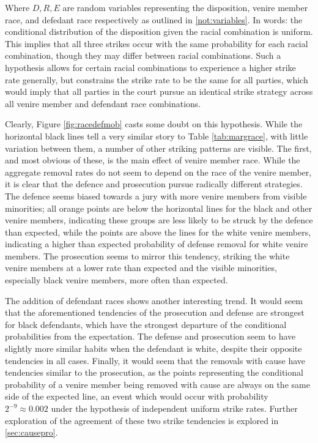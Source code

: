 Where $D, R, E$ are random variables representing the disposition, venire member race, and defedant race respectively as outlined
in \ref{not:variables}. In words: the conditional distribution of the disposition given the racial combination is uniform. This
implies that all three strikes occur with the same probability for each racial combination, though they may differ between racial
combinations. Such a hypothesis allows for certain racial combinations to experience a higher strike rate generally, but
constrains the strike rate to be the same for all parties, which would imply that all parties in the court pursue an identical
strike strategy across all venire member and defendant race combinations.

Clearly, Figure \ref{fig:racedefmob} casts some doubt on this hypothesis. While the horizontal black lines tell a very similar
story to Table \ref{tab:margrace}, with little variation between them, a number of other striking patterns are visible. The first,
and most obvious of these, is the main effect of venire member race. While the aggregate removal rates do not seem to depend on
the race of the venire member, it is clear that the defence and prosecution pursue radically different strategies. The defence
seems biased towards a jury with more venire members from visible minorities; all orange points are below the horizontal lines for
the black and other venire members, indicating these groups are less likely to be struck by the defence than expected, while the
points are above the lines for the white venire members, indicating a higher than expected probability of defense removal for
white venire members. The prosecution seems to mirror this tendency, striking the white venire members at a lower rate than
expected and the visible minorities, especially black venire members, more often than expected.

The addition of defendant races shows another interesting trend. It would seem that the aforementioned tendencies of the
prosecution and defense are strongest for black defendants, which have the strongest departure of the conditional probabilities
from the expectation. The defense and prosecution seem to have slightly more similar habits when the defendant is white, despite
their opposite tendencies in all cases. Finally, it would seem that the removals with cause have tendencies similar to the
prosecution, as the points representing the conditional probability of a venire member being removed with cause are always on the
same side of the expected line, an event which would occur with probability $2^{-9} \approx 0.002$ under the hypothesis of
independent uniform strike rates. Further exploration of the agreement of these two strike tendencies is explored in
\ref{sec:causepro}.

